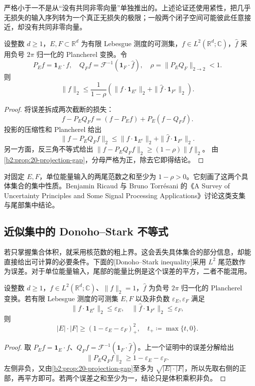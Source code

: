 严格小于一不是从“没有共同非零向量”单独推出的。上述论证还使用紧性，把几乎无损失的输入序列转为一个真正无损失的极限；一般两个闭子空间可能彼此任意接近，却没有共同非零向量。

\begin{corollary}[有限测度集的尾部估计]
\label{b2:thm:20-annihilating-pair}
设整数 \(d\geq1\)，\(E,F\subset\mathbb R^d\) 为有限 Lebesgue 测度的可测集，\(f\in L^2(\mathbb R^d;\mathbb C)\)，\(\widehat f\) 采用负号 \(2\pi\) 归一化的 Plancherel 变换。令
\[
 P_Ef=\mathbf1_E\cdot f,
 \quad Q_Ff=\mathcal F^{-1}(\mathbf1_F\cdot\widehat f),
 \quad \rho=\|P_EQ_F\|_{2\to2}<1.
\]
则
\[
 \|f\|_2\leq\frac1{1-\rho}
 \left(\|f\cdot\mathbf1_{E^c}\|_2+
       \|\widehat f\cdot\mathbf1_{F^c}\|_2\right).
\]
\end{corollary}
\begin{proof}
将误差拆成两次截断的损失：
\[
 f-P_EQ_Ff=(f-P_Ef)+P_E(f-Q_Ff).
\]
投影的压缩性和 Plancherel 给出
\[
 \|f-P_EQ_Ff\|_2
 \leq\|f\cdot\mathbf1_{E^c}\|_2+
       \|\widehat f\cdot\mathbf1_{F^c}\|_2.
\]
另一方面，反三角不等式给出
\(\|f-P_EQ_Ff\|_2\geq(1-\rho)\|f\|_2\)。
由\cref{b2:prop:20-projection-gap}，分母严格为正，除去它即得结论。
\end{proof}

对固定 \(E,F\)，单位能量输入的两尾范数之和至少为 \(1-\rho>0\)。它刻画了这两个具体集合的集中性质。Benjamin Ricaud 与 Bruno Torrésani 的《A Survey of Uncertainty Principles and Some Signal Processing Applications》\cite[Section 3.3.2]{Ricaud2013Survey}讨论这类支集与尾部集中结论。

\subsection{近似集中的 Donoho–Stark 不等式}
\label{b2:subsec:200304}

若只掌握集合体积，就采用核范数的粗上界。这会丢失具体集合的部分信息，却能直接给出可计算的必要条件。下面的[Donoho--Stark inequality]采用 \(L^2\) 尾范数作为误差。对于单位能量输入，尾部的能量比例是这个误差的平方，二者不能混用。

\begin{theorem}\label{b2:thm:20-donoho-stark}
设整数 \(d\geq1\)，\(f\in L^2(\mathbb R^d;\mathbb C)\)、\(\|f\|_2=1\)，\(\widehat f\) 为负号 \(2\pi\) 归一化的 Plancherel 变换。若有限 Lebesgue 测度的可测集 \(E,F\) 以及非负数 \(\varepsilon_E,\varepsilon_F\) 满足
\[
 \|f\cdot\mathbf1_{E^c}\|_2\leq\varepsilon_E,
 \quad
 \|\widehat f\cdot\mathbf1_{F^c}\|_2\leq\varepsilon_F,
\]
则
\[
 |E|\cdot|F|\geq(1-\varepsilon_E-\varepsilon_F)_+^2,
 \quad t_+\coloneqq\max\{t,0\}.
\]
\end{theorem}
\begin{proof}
取 \(P_Ef=\mathbf1_E\cdot f\)、\(Q_Ff=\mathcal F^{-1}(\mathbf1_F\cdot\widehat f)\)。上一个证明中的误差分解给出
\[
 \|P_EQ_Ff\|_2\geq1-\varepsilon_E-\varepsilon_F.
\]
左侧非负，又由\cref{b2:prop:20-projection-gap}至多为 \(\sqrt{|E|\cdot|F|}\)，所以先取右侧的正部，再平方即可。若两个误差之和至少为一，结论只是体积乘积非负。
\end{proof}


